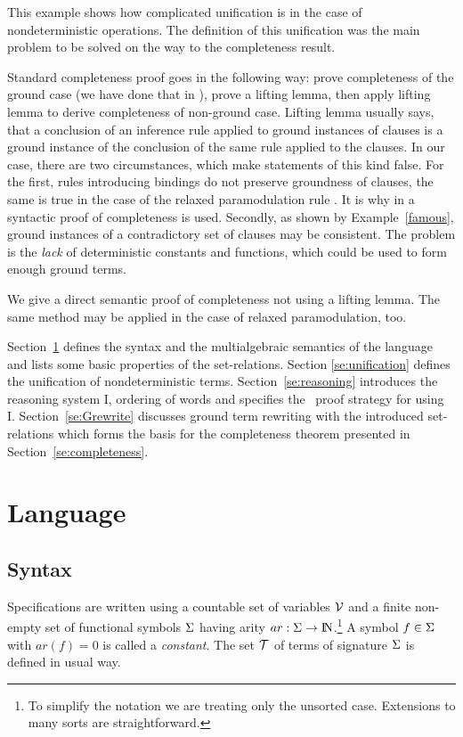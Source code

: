 This example shows how complicated unification is in the case of
nondeterministic operations.  The definition of this unification was the
main problem to be solved on the way to the completeness result.

Standard completeness proof goes in the following way: prove completeness of
the ground case (we have done that in \cite {KW}), prove a lifting lemma,
then apply lifting lemma to derive completeness of non-ground case.  Lifting
lemma usually says, that a conclusion of an inference rule applied to ground
instances of clauses is a ground instance of the conclusion of the same rule
applied to the clauses.  In our case, there are two circumstances, which
make statements of this kind false.  For the first, rules introducing bindings do
not preserve groundness of clauses, the same is true in the case of the
relaxed paramodulation rule \cite {relaxed-par}.  It is why in \cite
{relaxed-par} a syntactic proof of completeness is used.  Secondly, as shown
by Example~\ref{famous}, ground
instances of a contradictory set of clauses may be consistent.
The problem is the {\em lack}
of deterministic constants and functions, which could be used to
form enough  ground terms.

We give a direct semantic proof of completeness not using a lifting lemma.
The same method may be applied in the case of relaxed paramodulation, too.

Section~\ref{se:nd-specs} defines the syntax and the multialgebraic semantics 
of the language and lists some basic properties of the set-relations. 
Section \ref{se:unification} defines the unification of nondeterministic terms.
Section~\ref{se:reasoning} introduces the reasoning system \C I, ordering of 
words and specifies the \strategy\ proof strategy for using \C I.
Section~\ref{se:Grewrite} discusses ground term rewriting with the introduced 
set-relations which forms the basis for the completeness theorem presented in
Section~\ref{se:completeness}.


\section{Language}\label{se:nd-specs}

\subsection{Syntax}

Specifications are written using a countable set of variables ${\cal V}$ and a
finite non-empty set of functional symbols $\Sigma$ having arity
\(ar:\Sigma\to {{\rm I\!N}}\).\footnote{To simplify the notation we are treating only
the unsorted case. Extensions to many sorts are straightforward.}  A symbol
\(f\in\Sigma\) with \(ar(f)=0\) is called a {\em constant}.  The set ${\cal T}$
of terms of signature $\Sigma$ is defined in usual way. 

